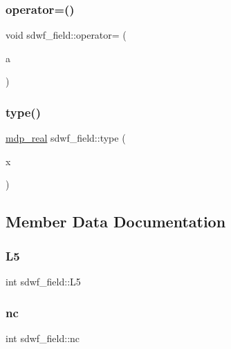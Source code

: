 \subsubsection{\texorpdfstring{operator=()}{operator=()}}
{\footnotesize\ttfamily void sdwf\+\_\+field\+::operator= (\begin{DoxyParamCaption}\item[{\hyperlink{classmdp__complex}{mdp\+\_\+complex}}]{a }\end{DoxyParamCaption})\hspace{0.3cm}{\ttfamily [inline]}}

\mbox{\label{classsdwf__field_a7227345aef0414528513479dad854568}} 
\subsubsection{\texorpdfstring{type()}{type()}}
{\footnotesize\ttfamily \hyperlink{mdp__global__vars_8h_a69d96b74c791e0bbdb888b3913a69450}{mdp\+\_\+real} sdwf\+\_\+field\+::type (\begin{DoxyParamCaption}\item[{\hyperlink{mdp__compatibility__macros_8h_aa6f1179c424e48adef1cedf7c436eb75}{site}}]{x }\end{DoxyParamCaption})\hspace{0.3cm}{\ttfamily [inline]}}



\subsection{Member Data Documentation}
\mbox{\label{classsdwf__field_a19bd0e3027574c1204f8aa3f6635d1df}} 
\subsubsection{\texorpdfstring{L5}{L5}}
{\footnotesize\ttfamily int sdwf\+\_\+field\+::\+L5}

\mbox{\label{classsdwf__field_a957d5e1caa928243ec4224cf1e2861f1}} 
\subsubsection{\texorpdfstring{nc}{nc}}
{\footnotesize\ttfamily int sdwf\+\_\+field\+::nc}

